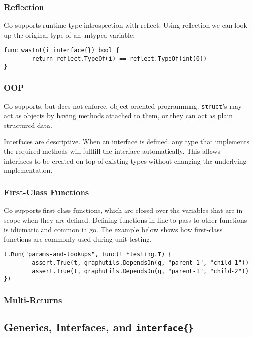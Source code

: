 \documentclass{beamer}
\begin{document}
\begin{frame} [fragile]
  \frametitle{Reflection}
  Go supports runtime type introspection with reflect.  Using
  reflection we can look up the original type of an untyped variable:
\\\vfill
\begin{lstlisting}[language=Golang]
func wasInt(i interface{}) bool {
        return reflect.TypeOf(i) == reflect.TypeOf(int(0))
}
\end{lstlisting}
\end{frame}

\begin{frame}
  \frametitle{OOP}

  Go supports, but does not enforce, object oriented programming.
  {\tt struct}'s may act as objects by having methods attached to
  them, or they can act as plain structured data.

  Interfaces are descriptive.  When an interface is defined, any type
  that implements the required methods will fullfill the interface
  automatically.  This allows interfaces to be created on top of
  existing types without changing the underlying implementation.
\end{frame}

\begin{frame}[fragile]
  \frametitle{First-Class Functions}

  Go supports first-class functions, which are closed over the
  variables that are in scope when they are defined.  Defining
  functions in-line to pass to other functions is idiomatic and common
  in go.  The example below shows how first-class functions are
  commonly used during unit testing.
\\\vfill
\begin{lstlisting}[language=Golang]
t.Run("params-and-lookups", func(t *testing.T) {
        assert.True(t, graphutils.DependsOn(g, "parent-1", "child-1"))
        assert.True(t, graphutils.DependsOn(g, "parent-1", "child-2"))
})
\end{lstlisting}
\end{frame}

\begin{frame}
  \frametitle{Multi-Returns}

\end{frame}

\subsection{Generics, Interfaces, and \tt{interface\{\}}}
\end{document}
